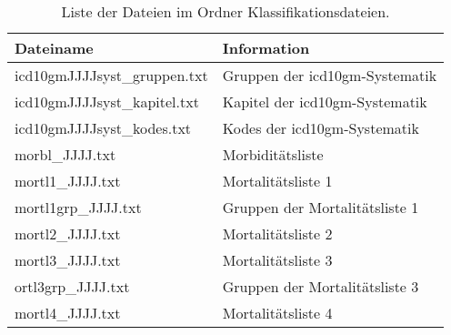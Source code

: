 \begin{table}[ht]
	\centering
	\small
	\caption{Liste der Dateien im Ordner Klassifikationsdateien.}
	\label{tab:classfiles}
	\begin{tabular}{|l|l|}
		\hline
		\rowcolor{lightgray} Dateiname & Information \\
		\hline 
		\textsf{icd10gmJJJJsyst\_gruppen.txt} &  Gruppen der \ac{icd10gm}-Systematik \\ \hline
		\textsf{icd10gmJJJJsyst\_kapitel.txt} & Kapitel der \ac{icd10gm}-Systematik \\ \hline
		\textsf{icd10gmJJJJsyst\_kodes.txt} & Kodes der \ac{icd10gm}-Systematik \\ \hline
		\textsf{morbl\_JJJJ.txt} & Morbiditätsliste  \\ \hline
		\textsf{mortl1\_JJJJ.txt} & Mortalitätsliste 1 \\ \hline
		\textsf{mortl1grp\_JJJJ.txt} & Gruppen der Mortalitätsliste 1 \\ \hline
		\textsf{mortl2\_JJJJ.txt} & Mortalitätsliste 2 \\ \hline
		\textsf{mortl3\_JJJJ.txt} & Mortalitätsliste 3 \\ \hline
		\textsf{ortl3grp\_JJJJ.txt} & Gruppen der Mortalitätsliste 3 \\ \hline
		\textsf{mortl4\_JJJJ.txt} & Mortalitätsliste 4 \\ \hline
	\end{tabular}
\end{table}

